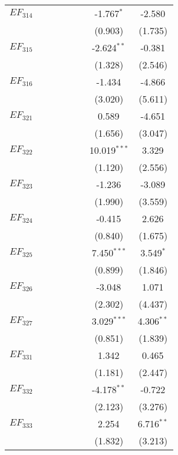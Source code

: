 \begin{longtable}[h]{lccccccc}
 $EF_{314}$& & & & & & -1.767$^{*}$ & -2.580$^{}$ \\
  & & & & & & (0.903) & (1.735) \\

 $EF_{315}$ & & & & & & -2.624$^{**}$ & -0.381$^{}$ \\
  & & & & & & (1.328) & (2.546) \\

 $EF_{316}$& & & & & & -1.434$^{}$ & -4.866$^{}$ \\
  & & & & & & (3.020) & (5.611) \\

 $EF_{321}$ & & & & & & 0.589$^{}$ & -4.651$^{}$ \\
  & & & & & & (1.656) & (3.047) \\

 $EF_{322}$ & & & & & & 10.019$^{***}$ & 3.329$^{}$ \\
  & & & & & & (1.120) & (2.556) \\

 $EF_{323}$ & & & & & & -1.236$^{}$ & -3.089$^{}$ \\
  & & & & & & (1.990) & (3.559) \\

 $EF_{324}$ & & & & & & -0.415$^{}$ & 2.626$^{}$ \\
  & & & & & & (0.840) & (1.675) \\

 $EF_{325}$ & & & & & & 7.450$^{***}$ & 3.549$^{*}$ \\
  & & & & & & (0.899) & (1.846) \\

 $EF_{326}$ & & & & & & -3.048$^{}$ & 1.071$^{}$ \\
  & & & & & & (2.302) & (4.437) \\

 $EF_{327}$& & & & & & 3.029$^{***}$ & 4.306$^{**}$ \\
  & & & & & & (0.851) & (1.839) \\

 $EF_{331}$ & & & & & & 1.342$^{}$ & 0.465$^{}$ \\
  & & & & & & (1.181) & (2.447) \\

 $EF_{332}$ & & & & & & -4.178$^{**}$ & -0.722$^{}$ \\
  & & & & & & (2.123) & (3.276) \\

 $EF_{333}$ & & & & & & 2.254$^{}$ & 6.716$^{**}$ \\
  & & & & & & (1.832) & (3.213) \\


\end{longtable}
